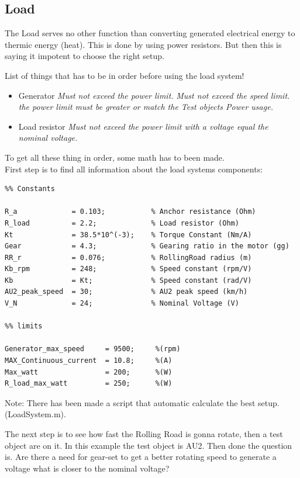 \subsection{Load}
\label{sec:Loadsystem_load}
The Load serves no other function than converting generated electrical energy to thermic energy (heat). This is done by using power resistors. But then this is saying it impotent to choose the right setup.

\large List of things that has to be in order before using the load system!
\begin{itemize}
	\item {Generator}
	\subitem \textit{Must not exceed the power limit.}
	\subitem \textit{Must not exceed the speed limit.}
	\subitem \textit{the power limit must be greater or match the Test objects Power usage.}
	\item {Load resistor}
	\subitem \textit{Must not exceed the power limit with a voltage equal the nominal voltage.}
\end{itemize}

To get all these thing in order, some math has to been made. \\
First step is to find all information about the load systems components: 

\lstset{language=MATLAB}
\begin{lstlisting}
%% Constants

R_a             = 0.103;           % Anchor resistance (Ohm)
R_load          = 2.2;             % Load resistor (Ohm)
Kt              = 38.5*10^(-3);    % Torque Constant (Nm/A)
Gear            = 4.3;             % Gearing ratio in the motor (gg)
RR_r            = 0.076;           % RollingRoad radius (m)
Kb_rpm          = 248;             % Speed constant (rpm/V)
Kb              = Kt;              % Speed constant (rad/V)
AU2_peak_speed  = 30;              % AU2 peak speed (km/h)
V_N             = 24;              % Nominal Voltage (V)

%% limits

Generator_max_speed     = 9500;     %(rpm)
MAX_Continuous_current  = 10.8;     %(A)
Max_watt                = 200;      %(W)
R_load_max_watt         = 250;      %(W)
\end{lstlisting}

Note: There has been made a script that automatic calculate the best setup. (LoadSystem.m).

The next step is to see how fast the Rolling Road is gonna rotate, then a test object are on it. In this example the test object is AU2. Then done the question is. Are there a need for gear-set to get a better rotating speed to generate a voltage what is closer to the nominal voltage?

